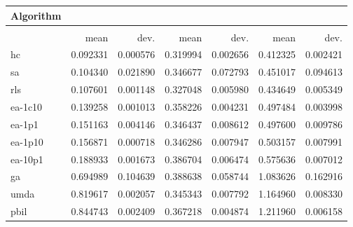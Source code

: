 \begin{tabular}{@{} l *{6}{>{{}}N{1}{2}} @{}}
\toprule
{Algorithm} &  \\
\midrule
&  &  &  \\
\midrule
& {mean} & {dev.} & {mean} & {dev.} & {mean} & {dev.} \\
\midrule
hc & 0.092331 & 0.000576 & 0.319994 & 0.002656 & 0.412325 & 0.002421 \\
sa & 0.104340 & 0.021890 & 0.346677 & 0.072793 & 0.451017 & 0.094613 \\
rls & 0.107601 & 0.001148 & 0.327048 & 0.005980 & 0.434649 & 0.005349 \\
ea-1c10 & 0.139258 & 0.001013 & 0.358226 & 0.004231 & 0.497484 & 0.003998 \\
ea-1p1 & 0.151163 & 0.004146 & 0.346437 & 0.008612 & 0.497600 & 0.009786 \\
ea-1p10 & 0.156871 & 0.000718 & 0.346286 & 0.007947 & 0.503157 & 0.007991 \\
ea-10p1 & 0.188933 & 0.001673 & 0.386704 & 0.006474 & 0.575636 & 0.007012 \\
ga & 0.694989 & 0.104639 & 0.388638 & 0.058744 & 1.083626 & 0.162916 \\
umda & 0.819617 & 0.002057 & 0.345343 & 0.007792 & 1.164960 & 0.008330 \\
pbil & 0.844743 & 0.002409 & 0.367218 & 0.004874 & 1.211960 & 0.006158 \\
\bottomrule
\end{tabular}
